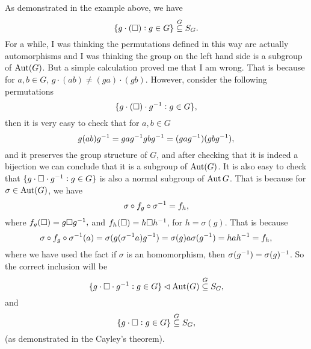 \begin{observation}
	 \begin{example}
	 	As demonstrated in the example above, we have
	 	\[ \{g\cdot(\square): g\in G\} \overset{G}{\subseteq} S_G. \]
	 	For a while, I was thinking the permutations defined in this way are actually automorphisms and I was thinking the group on the left hand side is a subgroup of $ \operatorname{Aut}(G) $. But a simple calculation proved me that I am wrong. That is because for $ a,b \in G $, $ g\cdot(ab) \neq (ga)\cdot(gb) $. However, consider the following permutations
	 	\[ \{g\cdot(\square)\cdot g^{-1}: g\in G\}, \]
	 	then it is very easy to check that for $ a,b\in G $
	 	\[  g(ab)g^{-1} = gag^{-1} g b g^{-1} = (gag^{-1})(gbg^{-1}),  \]
	 	and it preserves the group structure of $ G $, and after checking that it is indeed a bijection we can conclude that it is a subgroup of $ \operatorname{Aut}(G) $. It is also easy to check that $ \{g\cdot\square\cdot g^{-1}: g\in G\} $ is also a normal subgroup of $ \operatorname{Aut}{G} $. That is because for $ \sigma \in \operatorname{Aut}(G) $, we have
	 	\[ \sigma\circ f_g \circ \sigma^{-1} = f_h, \]
	 	where $ f_g(\square) = g\square g^{-1}, $ and $ f_h(\square) = h\square h^{-1} $, for $ h = \sigma(g) $. That is because
	 	\[  \sigma\circ f_g \circ \sigma^{-1}(a) = \sigma(g(\sigma^{-1}a)g^{-1}) = \sigma(g) a \sigma(g^{-1}) = hah^{-1} = f_h, \]
	 	where we have used the fact if $ \sigma $ is an homomorphism, then $ \sigma(g^{-1}) = \sigma(g)^{-1} $.
	 	So the correct inclusion will be
	 	\[ \{g\cdot\square\cdot g^{-1}: g\in G\} \lhd \operatorname{Aut}(G) \overset{G}{\subseteq} S_G, \]
	 	and
	 	\[ \{g\cdot\square: g\in G\} \overset{G}{\subseteq} S_G, \]
	 	(as demonstrated in the Cayley's theorem).
	 \end{example}
	 
	 
	 
	 
\end{observation}


